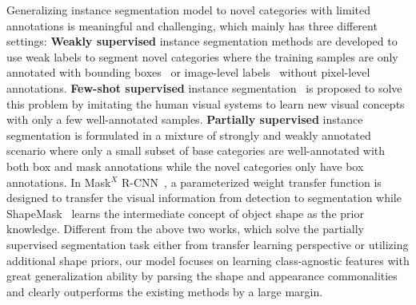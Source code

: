 \documentclass[runningheads]{llncs}
\begin{document}
Generalizing instance segmentation model to novel categories with limited annotations is meaningful and challenging, which mainly has three different settings:  
{\bf Weakly supervised} instance segmentation methods are developed to use weak labels to segment novel categories where the training samples are only annotated with bounding boxes~\cite{khoreva2017simple,remez2018learning} or image-level labels~\cite{ahn2019weakly,zhou2018weakly} without pixel-level annotations. {\bf Few-shot supervised} instance segmentation~\cite{yan2019metarcnn} is proposed to solve this problem by imitating the human visual systems to learn new visual concepts with only a few well-annotated samples. 
{\bf Partially supervised} instance segmentation is formulated in a mixture of strongly and weakly annotated scenario where only a small subset of base categories are well-annotated with both box and mask annotations while the novel categories only have box annotations. 
In Mask$^X$ R-CNN~\cite{hu2018learning}, a parameterized weight transfer function is designed to transfer the visual information from detection to segmentation while ShapeMask~\cite{kuo2019shapemask} learns the intermediate concept of object shape as the prior knowledge. 
Different from the above two works, which solve the partially supervised segmentation task either from transfer learning perspective or utilizing additional shape priors, our model focuses on learning class-agnostic features with great generalization ability by parsing the shape and appearance commonalities and clearly outperforms the existing methods by a large margin.




\vspace{-3mm}
\end{document}
